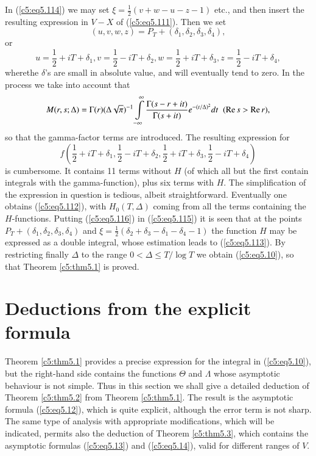 In (\ref{c5:eq5.114}) we may set $\xi =\frac{1}{2} (v+w-u-z-1)$ etc.,
and then insert the resulting expression in $V-X$ of
(\ref{c5:eq5.111}). Then we set 
$$
(u,v,w,z) = P_T + (\delta_1, \delta_2, \delta_3, \delta_4),
$$
or 
$$
u =\frac{1}{2} + iT + \delta_1, v = \frac{1}{2} -iT + \delta_2, w
=\frac{1}{2}+iT+\delta_3, z =\frac{1}{2} -iT + \delta_4, 
$$
where\pageoriginale the $\delta$'s are small in absolute value, and
will eventually tend to zero. In the process we take into account that 
{\fontsize{10pt}{12pt}\selectfont
\begin{equation}
M(r,s;\Delta) = \Gamma (r) (\Delta \sqrt{\pi})^{-1}
\int\limits^{\infty}_{-\infty} \frac{\Gamma (s-r+it)}{\Gamma(s+it)}
e^{-(t/\Delta)^2} dt \;\; (\operatorname{Re} s > \operatorname{Re} r), 
\label{c5:eq5.116}
\end{equation}}
so that the gamma-factor terms are introduced. The resulting
expression for  
$$
f \left(\frac{1}{2} +iT + \delta_1, \frac{1}{2} - iT + \delta_2,
\frac{1}{2} + iT + \delta_3, \frac{1}{2} - iT + \delta_4 \right)  
$$
is cumbersome. It contains 11 terms without $H$ (of which all but the
first contain integrals with the gamma-function), plus six terms with
$H$. The simplification of the expression in question is tedious,
albeit straightforward. Eventually one obtains (\ref{c5:eq5.112}),
with $H_0(T,\Delta)$ coming from all the terms containing the
$H$-functions. Putting (\ref{c5:eq5.116}) in (\ref{c5:eq5.115}) it is
seen that at the points $P_T+ (\delta_1, \delta_2, \delta_3,
\delta_4)$ and $\xi =\frac{1}{2} (\delta_2 + \delta_3
-\delta_1-\delta_4-1)$ the function $H$ may be expressed as a double
integral, whose estimation leads to (\ref{c5:eq5.113}). By restricting
finally $\Delta$  to the range $0<\Delta \leq T /\log T$ we obtain
(\ref{c5:eq5.10}), so that Theorem \ref{c5:thm5.1} is proved. 

\section{Deductions from the  explicit formula}\label{c5:sec5.5}

Theorem \ref{c5:thm5.1} provides a precise expression for the integral
in (\ref{c5:eq5.10}), but the right-hand side contains the functions
$\Theta$ and $\Lambda$ whose asymptotic behaviour is not simple. Thus
in this section we shall give a detailed deduction of Theorem
\ref{c5:thm5.2} from Theorem \ref{c5:thm5.1}. The result is the
asymptotic formula (\ref{c5:eq5.12}), which is quite explicit,
although the error term is not sharp. The same type of analysis with
appropriate modifications, which will be indicated, permits also the
deduction of Theorem \ref{c5:thm5.3}, which contains the asymptotic
formulas (\ref{c5:eq5.13}) and (\ref{c5:eq5.14}), valid for different
ranges of $V$. 

